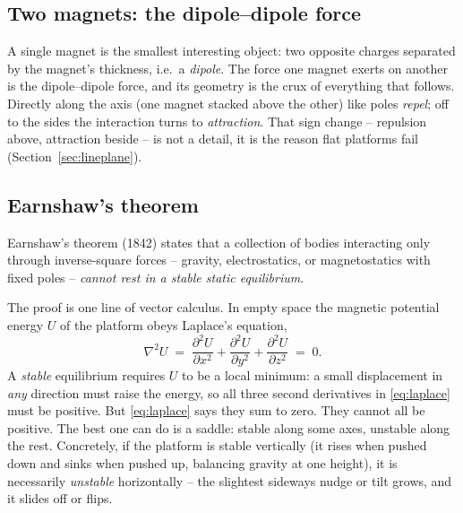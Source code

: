 \documentclass[11pt]{article}
\begin{document}
\subsection{Two magnets: the dipole--dipole force}

A single magnet is the smallest interesting object: two opposite charges
separated by the magnet's thickness, i.e.\ a \emph{dipole}. The force one
magnet exerts on another is the dipole--dipole force, and its geometry is the
crux of everything that follows. Directly along the axis (one magnet stacked
above the other) like poles \emph{repel}; off to the sides the interaction
turns to \emph{attraction}. That sign change -- repulsion above, attraction
beside -- is not a detail, it is the reason flat platforms fail
(Section~\ref{sec:lineplane}).

\subsection{Earnshaw's theorem}\label{sec:earnshaw}

Earnshaw's theorem (1842) states that a collection of bodies interacting only
through inverse-square forces -- gravity, electrostatics, or magnetostatics
with fixed poles -- \emph{cannot rest in a stable static equilibrium}.

The proof is one line of vector calculus. In empty space the magnetic potential
energy $U$ of the platform obeys Laplace's equation,
%
\begin{equation}
  \nabla^2 U \;=\;
  \frac{\partial^2 U}{\partial x^2}
  + \frac{\partial^2 U}{\partial y^2}
  + \frac{\partial^2 U}{\partial z^2} \;=\; 0 .
  \label{eq:laplace}
\end{equation}
%
A \emph{stable} equilibrium requires $U$ to be a local minimum: a small
displacement in \emph{any} direction must raise the energy, so all three second
derivatives in \eqref{eq:laplace} must be positive. But \eqref{eq:laplace} says
they sum to zero. They cannot all be positive. The best one can do is a saddle:
stable along some axes, unstable along the rest. Concretely, if the platform is
stable vertically (it rises when pushed down and sinks when pushed up, balancing
gravity at one height), it is necessarily \emph{unstable} horizontally -- the
slightest sideways nudge or tilt grows, and it slides off or flips.
\end{document}
